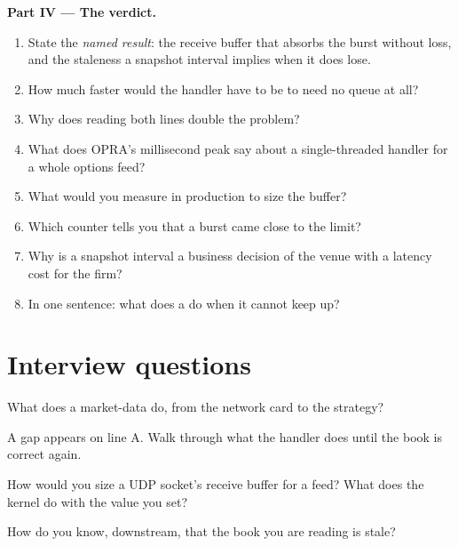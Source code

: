 \begin{problem}
\medskip\noindent\textbf{Part IV --- The verdict.}
\begin{enumerate}[resume]
\item State the \emph{named result}: the receive buffer that absorbs the burst without loss, and the staleness a snapshot
interval implies when it does lose.
\item How much faster would the handler have to be to need no queue at all?
\item Why does reading both lines double the problem?
\item What does OPRA's millisecond peak say about a single-threaded handler for a whole options feed?
\item What would you measure in production to size the buffer?
\item Which counter tells you that a burst came close to the limit?
\item Why is a snapshot interval a business decision of the venue with a latency cost for the firm?
\item In one sentence: what does a  do when it cannot keep up?
\end{enumerate}
\end{problem}

\section{Interview questions}

\begin{interviewq}\label{iq:ll:the-feed-handler:1}
What does a market-data  do, from the network card to the strategy?
\end{interviewq}

\begin{interviewq}\label{iq:ll:the-feed-handler:2}
A gap appears on line A. Walk through what the handler does until the book is correct again.
\end{interviewq}

\begin{interviewq}\label{iq:ll:the-feed-handler:3}
How would you size a UDP socket's receive buffer for a feed? What does the kernel do with the value you set?
\end{interviewq}

\begin{interviewq}\label{iq:ll:the-feed-handler:4}
How do you know, downstream, that the book you are reading is stale?
\end{interviewq}


